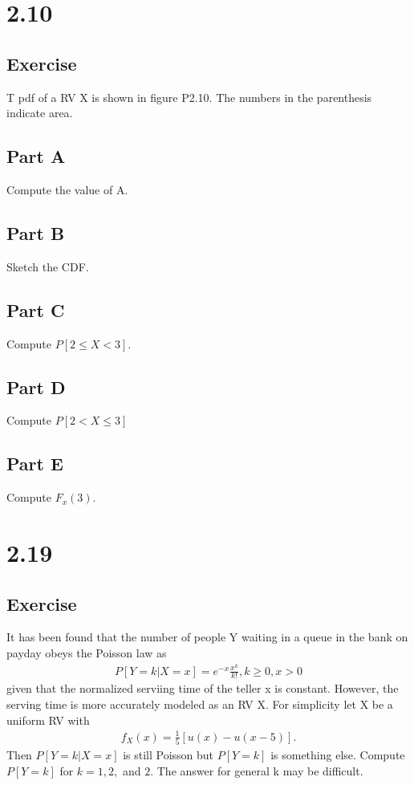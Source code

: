 \documentclass[12pt]{article}
\begin{document}
\section{2.10}

\subsection{Exercise}
T pdf of a RV X is shown in figure P2.10. The numbers in the parenthesis indicate area. 
\subsection{Part A}
Compute the value of A.
\subsection{Part B}
Sketch the CDF.
\subsection{Part C}
Compute $P[2\leq X<3]$.
\subsection{Part D}
Compute $P[2<X\leq 3]$
\subsection{Part E}
Compute $F_x(3)$.

\section{2.19}
\subsection{Exercise}
It has been found that the number of people Y waiting in a queue in the bank on payday obeys the Poisson law as
\begin{align*}
P[Y=k|X=x]=e^{-x}\frac{x^k}{k!}, k\geq0, x>0
\end{align*}
given that the normalized serviing time of the teller x is constant. However, the serving time is more accurately modeled
as an RV X. For simplicity let X be a uniform RV with 
\begin{align*}
f_X(x)=\frac{1}{5}[u(x)-u(x-5)].
\end{align*}
Then $P[Y=k|X=x]$ is still Poisson but $P[Y=k]$ is something else. Compute $P[Y=k]$ for $k=1,2,$ and $2$. The answer for
general k may be difficult.
\end{document}
